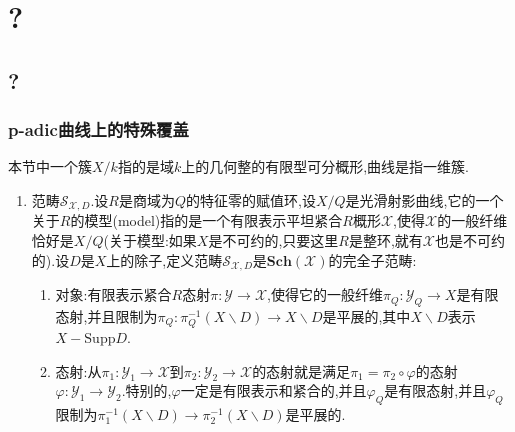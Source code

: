 \chapter{?}
\section{?}
\subsection{p-adic曲线上的特殊覆盖}

本节中一个簇$X/k$指的是域$k$上的几何整的有限型可分概形,曲线是指一维簇.
\begin{enumerate}
	\item 范畴$\mathcal{S}_{\mathcal{X},D}$.设$R$是商域为$Q$的特征零的赋值环,设$X/Q$是光滑射影曲线,它的一个关于$R$的模型(model)指的是一个有限表示平坦紧合$R$概形$\mathcal{X}$,使得$\mathcal{X}$的一般纤维恰好是$X/Q$(关于模型:如果$X$是不可约的,只要这里$R$是整环,就有$\mathcal{X}$也是不可约的).设$D$是$X$上的除子,定义范畴$\mathcal{S}_{\mathcal{X},D}$是$\textbf{Sch}(\mathcal{X})$的完全子范畴:
	\begin{enumerate}
		\item 对象:有限表示紧合$R$态射$\pi:\mathcal{Y}\to\mathcal{X}$,使得它的一般纤维$\pi_Q:\mathcal{Y}_Q\to X$是有限态射,并且限制为$\pi_Q:\pi_Q^{-1}(X\backslash D)\to X\backslash D$是平展的,其中$X\backslash D$表示$X-\mathrm{Supp}D$.
		\item 态射:从$\pi_1:\mathcal{Y}_1\to\mathcal{X}$到$\pi_2:\mathcal{Y}_2\to\mathcal{X}$的态射就是满足$\pi_1=\pi_2\circ\varphi$的态射$\varphi:\mathcal{Y}_1\to\mathcal{Y}_2$.特别的,$\varphi$一定是有限表示和紧合的,并且$\varphi_Q$是有限态射,并且$\varphi_Q$限制为$\pi_1^{-1}(X\backslash D)\to\pi_2^{-1}(X\backslash D)$是平展的.
	\end{enumerate}


\end{enumerate}
